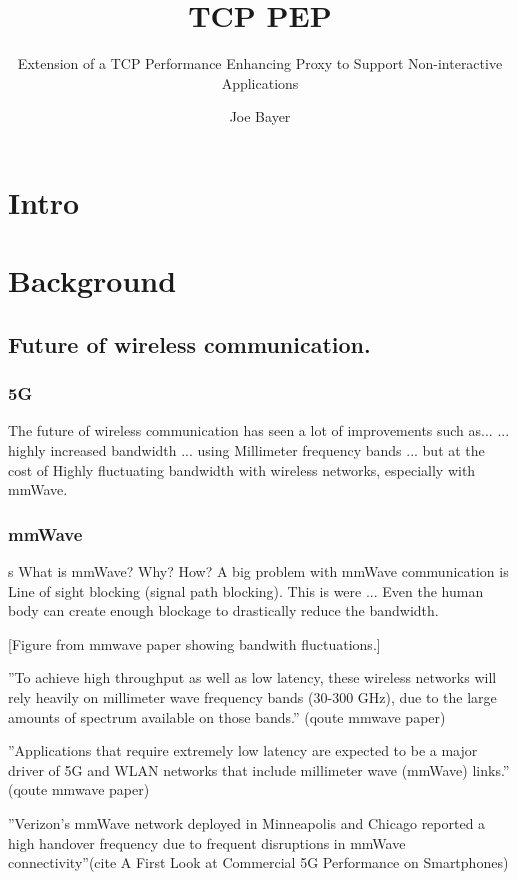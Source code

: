 \documentclass[a4paper,english, 11pt]{report}
\author{Joe Bayer}
\title{TCP PEP}
\subtitle{Extension of a TCP Performance Enhancing Proxy to
Support Non-interactive Applications}
\begin{document}
\uiomasterfp[program={Informatics: Programming and System Architecture}, supervisors={Michael Welzl\and Kristjon Ciko}]

\tableofcontents

\chapter{Intro}

\chapter{Background}

\section{Future of wireless communication.}
\subsection{5G}
The future of wireless communication has seen a lot of improvements such as...
... highly increased bandwidth ... using Millimeter frequency bands ... but at the cost of Highly fluctuating bandwidth with wireless networks, especially with mmWave.\\

\subsection{mmWave}s
What is mmWave? Why? How?
A big problem with mmWave communication is Line of sight blocking (signal path blocking). This is were ...
Even the human body can create enough blockage to drastically reduce the bandwidth. 

[Figure from mmwave paper showing bandwith fluctuations.]

''To achieve high throughput as well as low latency, these
wireless networks will rely heavily on millimeter wave frequency bands (30-300 GHz), due to the large amounts of
spectrum available on those bands.'' (qoute mmwave paper)

''Applications that require extremely low latency are
expected to be a major driver of 5G and WLAN networks that
include millimeter wave (mmWave) links.'' (qoute mmwave paper)

''Verizon’s mmWave network deployed in
Minneapolis and Chicago reported a high handover frequency
due to frequent disruptions in mmWave connectivity''(cite A First Look at Commercial 5G Performance on Smartphones)
\end{document}
